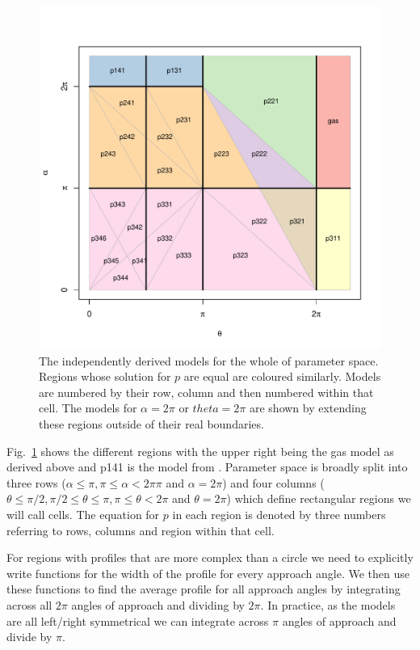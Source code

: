 \documentclass[a4paper,10pt,reqno,oneside]{amsart}
\begin{document}
\begin{figure}
\centering
\includegraphics[width=1\textwidth]{imgs/equalRegions.pdf}
\caption{The independently derived models for the whole of parameter space. Regions whose solution for $p$ are equal are coloured similarly. Models are numbered by their row, column and then numbered within that cell. The models for $\alpha = 2\pi$ or $theta =  2\pi$ are shown by extending these regions outside of their real boundaries.}
\label{f:regions}
\end{figure}

Fig.~\ref{f:regions} shows the different regions with the upper right being the gas model as derived above and p141 is the model from \citep{rowcliffe2008estimating}. Parameter space is broadly split into three rows ($ \alpha \le \pi, \pi \le \alpha < 2π\pi$ and $ \alpha = 2\pi$) and four columns ($ \theta \le \pi/2,  \pi/2 \le \theta \le  \pi,  \pi \le \theta < 2\pi$ and $\theta = 2\pi$) which define rectangular regions we will call cells. The equation for $p$ in each region is denoted by three numbers referring to rows, columns and region within that cell. 

For regions with profiles that are more complex than a circle we need to explicitly write functions for the width of the profile for every approach angle. We then use these functions to find the average profile for all approach angles by integrating across all $2\pi$ angles of approach and dividing by $2\pi$. In practice, as the models are all left/right symmetrical we can integrate across $\pi$ angles of approach and divide by $\pi$.
\end{document}
